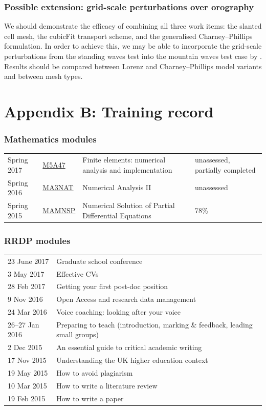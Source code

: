 \documentclass[a4paper,11pt]{article}
\begin{document}
\subsubsection*{Possible extension: grid-scale perturbations over orography}
\noindent We should demonstrate the efficacy of combining all three work items: the slanted cell mesh, the cubicFit transport scheme, and the generalised Charney--Phillips formulation.  In order to achieve this, we may be able to incorporate the grid-scale perturbations from the standing waves test into the mountain waves test case by \citet{schaer2002}.
Results should be compared between Lorenz and Charney--Phillips model variants and between mesh types.

\newpage

\section*{Appendix B: Training record}

\subsubsection*{Mathematics modules}
\footnotesize
\begin{tabular}{l l l l}
Spring 2017	& \href{https://finite-element.github.io}{M5A47}  & Finite elements: numerical analysis and implementation & unassessed, partially completed \\
Spring 2016	& \href{www.reading.ac.uk/module/document.aspx?modP=MA3NAT&modYR=1516}{MA3NAT} & Numerical Analysis II & unassessed \\
Spring 2015	& \href{www.reading.ac.uk/modules/document.aspx?modP=MAMNSP&modYR=1415}{MAMNSP} & Numerical Solution of Partial Differential Equations  & 78\% \\
\end{tabular}

\subsubsection*{RRDP modules}
\begin{tabular}{l l}
23 June 2017    & Graduate school conference \\
3 May 2017	& Effective CVs \\
28 Feb 2017	& Getting your first post-doc position \\
9 Nov 2016      & Open Access and research data management \\
24 Mar 2016	& Voice coaching: looking after your voice \\
26--27 Jan 2016 & Preparing to teach (introduction, marking \& feedback, leading small groups) \\
2 Dec 2015	& An essential guide to critical academic writing \\
17 Nov 2015	& Understanding the UK higher education context \\
19 May 2015	& How to avoid plagiarism \\
10 Mar 2015	& How to write a literature review \\
19 Feb 2015	& How to write a paper \\
\end{tabular}
\end{document}
